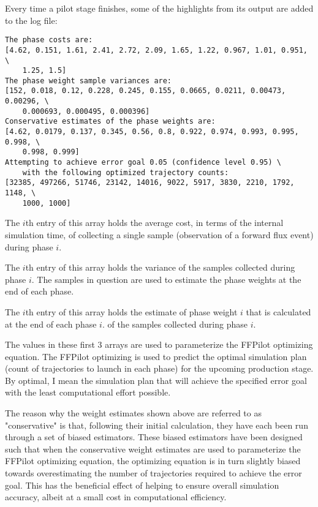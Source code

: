 {Every time a pilot stage finishes, some of the highlights from its output are added to the log file:
\begin{verbatim}
The phase costs are:
[4.62, 0.151, 1.61, 2.41, 2.72, 2.09, 1.65, 1.22, 0.967, 1.01, 0.951, \
    1.25, 1.5]
The phase weight sample variances are:
[152, 0.018, 0.12, 0.228, 0.245, 0.155, 0.0665, 0.0211, 0.00473, 0.00296, \
    0.000693, 0.000495, 0.000396]
Conservative estimates of the phase weights are:
[4.62, 0.0179, 0.137, 0.345, 0.56, 0.8, 0.922, 0.974, 0.993, 0.995, 0.998, \
    0.998, 0.999]
Attempting to achieve error goal 0.05 (confidence level 0.95) \
    with the following optimized trajectory counts:
[32385, 497266, 51746, 23142, 14016, 9022, 5917, 3830, 2210, 1792, 1148, \
    1000, 1000]
\end{verbatim}
\begin{description}[style=nextline]
    \item[phase costs] The $i$th entry of this array holds the average cost, in terms of the internal simulation time, of collecting a single sample (\ie observation of a forward flux event) during phase $i$.  
    \item[variances] The $i$th entry of this array holds the variance of the samples collected during phase $i$. The samples in question are used to estimate the phase weights at the end of each phase.
    \item[conservative weight estimates] The $i$th entry of this array holds the estimate of phase weight $i$ that is calculated at the end of each phase $i$.  of the samples collected during phase $i$.
\end{description}

The values in these first 3 arrays are used to parameterize the FFPilot optimizing equation\todo{add ref to my paper in submission}. The FFPilot optimizing is used to predict the optimal simulation plan (\ie count of trajectories to launch in each phase) for the upcoming production stage. By optimal, I mean the simulation plan that will achieve the specified error goal with the least computational effort possible. 

The reason why the weight estimates shown above are referred to as "conservative" is that, following their initial calculation, they have each been run through a set of biased estimators. These biased estimators have been designed such that when the conservative weight estimates are used to parameterize the FFPilot optimizing equation, the optimizing equation is in turn slightly biased towards overestimating the number of trajectories required to achieve the error goal. This has the beneficial effect of helping to ensure overall simulation accuracy, albeit at a small cost in computational efficiency. 

}
